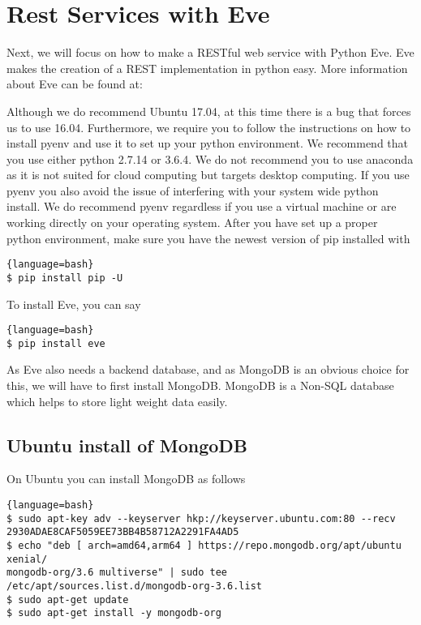 \section{Rest Services with Eve}\label{s:eve-intro}

Next, we will focus on how to make a RESTful web service with Python
Eve. Eve makes the creation of a REST implementation in python
easy. More information about Eve can be found at:


\begin{WARNING}

Although we do recommend Ubuntu 17.04, at this time there is a bug
that forces us to use 16.04. Furthermore, we require you to follow the
instructions on how to install pyenv and use it to set up your python
environment. We recommend that you use either python 2.7.14 or 3.6.4.
We do not recommend you to use anaconda as it is not suited for cloud
computing but targets desktop computing. If you use pyenv you also
avoid the issue of interfering with your system wide python
install. We do recommend pyenv regardless if you use a virtual machine
or are working directly on your operating system. After you have set
up a proper python environment, make sure you have the newest version
of pip installed with 

\smallskip

\begin{lstlisting}{language=bash}
$ pip install pip -U
\end{lstlisting}
\end{WARNING}

To install Eve, you can say 

\begin{lstlisting}{language=bash}
$ pip install eve
\end{lstlisting}

As Eve also needs a backend database, and as MongoDB is an obvious
choice for this, we will have to first install MongoDB.  MongoDB is a Non-SQL
database which helps to store light weight data easily.

\subsection{Ubuntu install of MongoDB}
On Ubuntu you can install MongoDB as follows

\begin{lstlisting}{language=bash}
$ sudo apt-key adv --keyserver hkp://keyserver.ubuntu.com:80 --recv 2930ADAE8CAF5059EE73BB4B58712A2291FA4AD5
$ echo "deb [ arch=amd64,arm64 ] https://repo.mongodb.org/apt/ubuntu xenial/
mongodb-org/3.6 multiverse" | sudo tee /etc/apt/sources.list.d/mongodb-org-3.6.list
$ sudo apt-get update
$ sudo apt-get install -y mongodb-org
\end{lstlisting}

